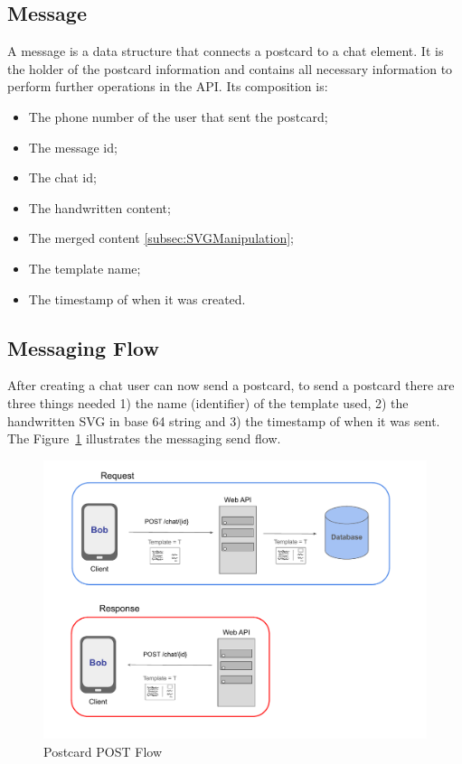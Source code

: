 \subsection{Message}
\label{subsec:Message}
A message is a data structure that connects a postcard to a chat element. It is the holder of the postcard information and contains all necessary information to perform further operations in the API.
Its composition is:
\begin{itemize}
    \item The phone number of the user that sent the postcard;
    \item The message id; 
    \item The chat id;
    \item The handwritten content;
    \item The merged content \ref{subsec:SVGManipulation};
    \item The template name;
    \item The timestamp of when it was created.
\end{itemize}


\subsection{Messaging Flow}
After creating a chat user can now send a postcard, to send a postcard there are three things needed 1) the name (identifier) of the template used, 2) the handwritten SVG in base 64 string and 3) the timestamp of when it was sent.
The Figure~\ref{fig:PSENDFlow} illustrates the messaging send flow.

\bigskip
\bigskip


\begin{figure}[!ht]
	\centering
	\includegraphics[trim={0cm 0cm 0cm 0cm}, width=1.1\textwidth]{./Chapter4/Figures/Postcard POST Flow}
	\caption{Postcard POST Flow}
	\label{fig:PSENDFlow}
\end{figure}

